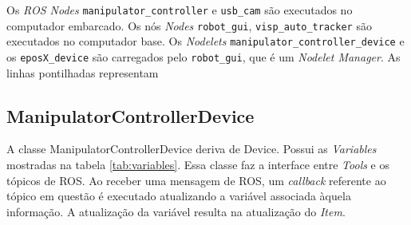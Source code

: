 Os \textit{ROS Nodes} \verb|manipulator_controller| e \verb|usb_cam| são executados no computador embarcado. Os nós \textit{Nodes} \verb|robot_gui|, \verb|visp_auto_tracker| são executados no computador base. Os \textit{Nodelets} \verb|manipulator_controller_device| e os \verb|eposX_device| são carregados pelo \verb|robot_gui|, que é um \textit{Nodelet Manager}. As linhas pontilhadas representam 

\subsection{ManipulatorControllerDevice}

A classe ManipulatorControllerDevice deriva de Device. Possui as \textit{Variables} mostradas na tabela \ref{tab:variables}. Essa classe faz a interface entre \textit{Tools} e os tópicos de ROS. Ao receber uma mensagem de ROS, um \textit{callback} referente ao tópico em questão é executado atualizando a variável associada àquela informação. A atualização da variável resulta na atualização do \textit{Item}.


